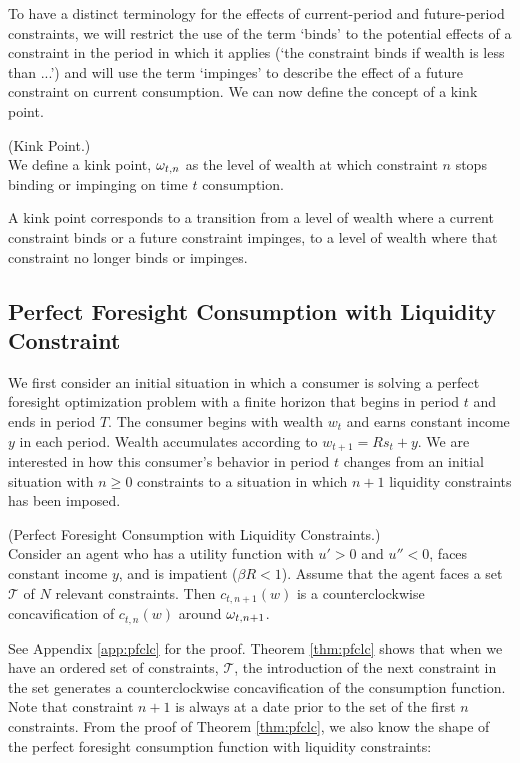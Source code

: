 To have a distinct terminology for the effects of current-period and future-period constraints, we will restrict the use of the term `binds' to the potential effects of a constraint in the period in which it applies (`the constraint binds if wealth is less than ...') and will use the term `impinges' to describe the effect of a future constraint on current consumption. We can now define the concept of a kink point.
\begin{defn}(Kink Point.) \\
	We define a kink point, $\omega_{t,n}$ as the level of wealth at which constraint $n$ stops binding or impinging on time $t$ consumption.
\end{defn}
A kink point corresponds to a transition from a level of wealth where a current constraint binds or a future constraint impinges, to a level of wealth where that constraint no longer binds or impinges.



\subsection{Perfect Foresight Consumption with Liquidity Constraint}\label{subsec:Piecewise}

We first consider an initial situation in which a consumer is solving a perfect foresight optimization problem with a finite horizon that begins in period $t$ and ends in period $T$. The consumer begins with wealth $w_{t}$ and earns constant income ${y}$ in each period. Wealth accumulates according to $w_{t+1} = Rs_{t}+{y}$. We are interested in how this consumer's behavior in period $t$ changes from an initial situation with $n\geq 0$ constraints to a situation in which $n+1$ liquidity constraints has been imposed.

\begin{theorem}\label{thm:pfclc}(Perfect Foresight Consumption with Liquidity Constraints.) \\
	Consider an agent who has a utility function with $u'> 0 $ and $u'' < 0$, faces constant income ${y}$, and is impatient ($\beta R < 1$). Assume that the agent faces a set $\mathcal{T}$ of $N$ relevant constraints. Then $c_{t,n+1}(w)$ is a counterclockwise concavification of $c_{t,n}(w)$ around $\omega_{t,n+1}$.
\end{theorem}

See Appendix \ref{app:pfclc} for the proof. Theorem \ref{thm:pfclc} shows that when we have an ordered set of constraints, $\mathcal{T}$, the introduction of the next constraint in the set generates a counterclockwise concavification of the consumption function. Note that constraint $n+1$ is always at a date prior to the set of the first $n$ constraints. From the proof of Theorem \ref{thm:pfclc}, we also know the shape of the perfect foresight consumption function with liquidity constraints:

